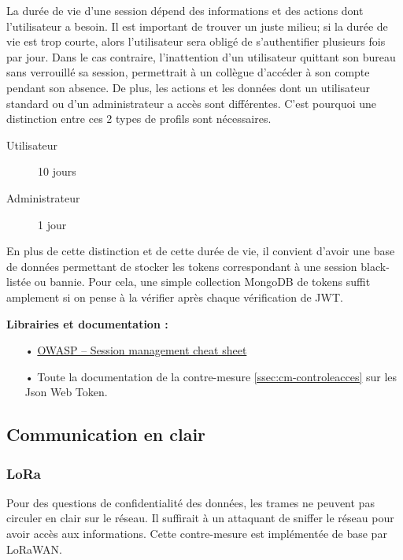 \documentclass[12pt]{article}
\begin{document}
La durée de vie d'une session dépend des informations et des actions dont l'utilisateur a besoin. Il est important de trouver un juste milieu; si la durée de vie est trop courte, alors l'utilisateur sera obligé de s'authentifier plusieurs fois par jour. Dans le cas contraire, l'inattention d'un utilisateur quittant son bureau sans verrouillé sa session, permettrait à un collègue d'accéder à son compte pendant son absence. De plus, les actions et les données dont un utilisateur standard ou d'un administrateur a accès sont différentes. C'est pourquoi une distinction entre ces 2 types de profils sont nécessaires.

\begin{description}
\item[Utilisateur] 10 jours
\item[Administrateur] 1 jour
\end{description}

En plus de cette distinction et de cette durée de vie, il convient d'avoir une base de données permettant de stocker les tokens correspondant à une session black-listée ou bannie. Pour cela, une simple collection MongoDB de tokens suffit amplement si on pense à la vérifier après chaque vérification de JWT.

\medskip
\textbf{Librairies et documentation :}

\begin{itemize}
\item[•] \href{https://www.owasp.org/index.php/Session_Management_Cheat_Sheet#Session_ID_Life_Cycle}{OWASP -- Session management cheat sheet}
\item[•] Toute la documentation de la contre-mesure \ref{ssec:cm-controleacces} sur les Json Web Token.
\end{itemize}

\subsection{Communication en clair}
\label{ssec:cm-tls}

\subsubsection{LoRa}

Pour des questions de confidentialité des données, les trames ne peuvent pas circuler en clair sur le réseau. Il suffirait à un attaquant de sniffer le réseau pour avoir accès aux informations. Cette contre-mesure est implémentée de base par LoRaWAN.
\end{document}
